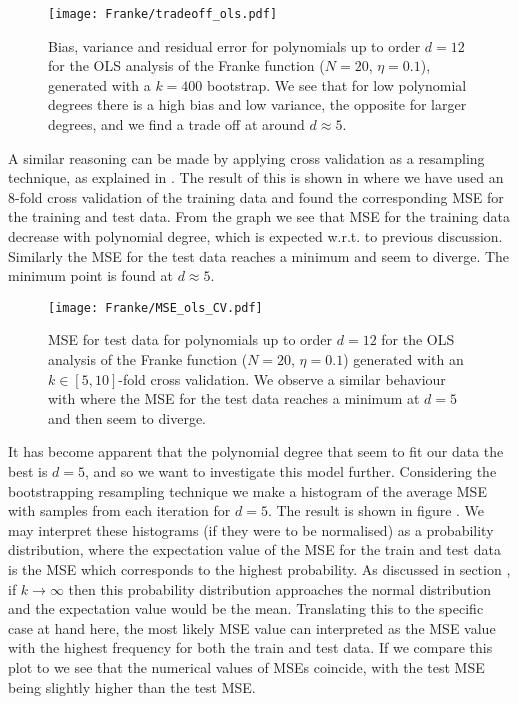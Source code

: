             
            \begin{figure}
                \texttt{[image: Franke/tradeoff\_ols.pdf]}
                \caption{Bias, variance and residual error for polynomials up to order $d=12$ for the OLS analysis of the Franke function ($N=20$, $\eta=0.1$), generated with a $k=400$ bootstrap. We see that for low polynomial degrees there is a high bias and low variance, the opposite for larger degrees, and we find a trade off at around $d\approx 5$.}
                \label{fig:bias_variance_ols}
            \end{figure}
            
            
            A similar reasoning can be made by applying cross validation as a resampling technique, as explained in . The result of this is shown in  where we have used an 8-fold cross validation of the training data and found the corresponding MSE for the training and test data. From the graph we see that MSE for the training data decrease with polynomial degree, which is expected w.r.t. to previous discussion. Similarly the MSE for the test data reaches a minimum and seem to diverge. The minimum point is found at $d\approx 5$.

            \begin{figure}
                \texttt{[image: Franke/MSE\_ols\_CV.pdf]}
                \caption{MSE for test data for polynomials up to order $d=12$ for the OLS analysis of the Franke function ($N=20$, $\eta=0.1$) generated with an $k\in[5,10]$-fold cross validation. We observe a similar behaviour with  where the MSE for the test data reaches a minimum at $d=5$ and then seem to diverge. }
                \label{fig:cross-validation_ols}
            \end{figure} 
            
            It has become apparent that the polynomial degree that seem to fit our data the best is $d=5$, and so we want to investigate this model further. Considering the bootstrapping resampling technique we make a histogram of the average MSE with samples from each iteration for $d=5$. The  result is shown  in figure . We may interpret these histograms (if they were to be normalised) as a probability distribution, where the expectation value of the MSE for the train and test data is the MSE which corresponds to the highest probability. As discussed in section , if $k\to\infty$ then this probability distribution approaches the normal distribution and the expectation value would be the mean. Translating this to the specific case at hand here, the most likely MSE value can interpreted as the MSE value with the highest frequency for both the train and test data. If we compare this plot to  we see that the numerical values of MSEs coincide, with the test MSE being slightly higher than the test MSE. 

